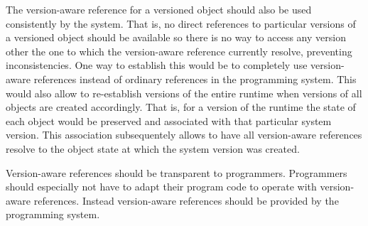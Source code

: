 The version-aware reference for a versioned object should also be used consistently by the system.
That is, no direct references to particular versions of a versioned object should be available so there is no way to access any version other the one to which the version-aware reference currently resolve, preventing inconsistencies.
One way to establish this would be to completely use version-aware references instead of ordinary references in the programming system.
This would also allow to re-establish versions of the entire runtime when versions of all objects are created accordingly.
That is, for a version of the runtime the state of each object would be preserved and associated with that particular system version.
This association subsequentely allows to have all version-aware references resolve to the object state at which the system version was created.

Version-aware references should be transparent to programmers.
Programmers should especially not have to adapt their program code to operate with version-aware references.
Instead version-aware references should be provided by the programming system.








